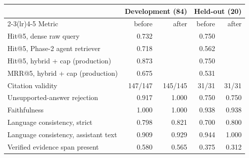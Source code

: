 \begin{tabular}{@{}lrrrr@{}}
\toprule
& \multicolumn{2}{c}{Development (84)} & \multicolumn{2}{c}{Held-out (20)} \\
\cmidrule(lr){2-3}\cmidrule(lr){4-5}
Metric & before & after & before & after \\
\midrule
Hit@5, dense raw query & 0.732 &  & 0.750 &  \\
Hit@5, Phase-2 agent retriever & 0.718 &  & 0.562 &  \\
Hit@5, hybrid + cap (production) & 0.873 &  & 0.750 &  \\
MRR@5, hybrid + cap (production) & 0.675 &  & 0.531 &  \\
Citation validity & 147/147 & 145/145 & 31/31 & 31/31 \\
Unsupported-answer rejection & 0.917 & 1.000 & 0.750 & 0.750 \\
Faithfulness & 1.000 & 1.000 & 0.938 & 0.938 \\
Language consistency, strict & 0.798 & 0.821 & 0.700 & 0.800 \\
Language consistency, assistant text & 0.909 & 0.929 & 0.944 & 1.000 \\
Verified evidence span present & 0.580 & 0.565 & 0.375 & 0.312 \\
\bottomrule
\end{tabular}